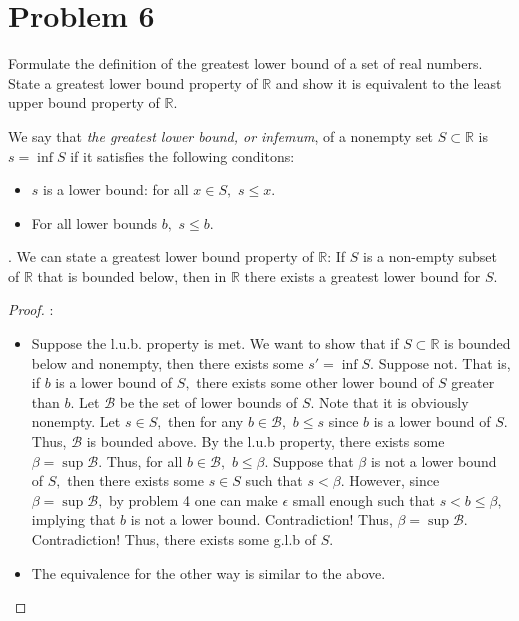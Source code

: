 \documentclass[11pt]{article}
\newcommand{\bbR}{\mathbb{R}}
\begin{document}
\section*{Problem 6}
\begin{problem}
    Formulate the definition of the greatest lower bound of a set of real numbers. State a greatest lower bound property of $\bbR$ and show it is equivalent to the least upper bound property of $\bbR.$
\end{problem}
\begin{solution}
    We say that \textit{the greatest lower bound, or infemum}, of a nonempty set $S\subset \bbR$ is $s = \inf S$ if it satisfies the following conditons:
    \begin{itemize}
        \item $s$ is a lower bound: for all $x\in S,$ $s\leq x.$
        \item For all lower bounds $b,$ $s\leq b.$
    \end{itemize}.
We can state a greatest lower bound property of $\bbR$: If $S$ is a non-empty subset of $\bbR$ that is bounded below, then in $\bbR$ there exists a greatest lower bound for $S.$
\begin{proof}:\\
    \begin{itemize}
        \item Suppose the l.u.b. property is met. We want to show that if $S\subset \bbR$ is bounded below and nonempty, then there exists some $s' = \inf S.$ Suppose not. That is, if $b$ is a lower bound of $S,$ there exists some other lower bound of $S$ greater than $b.$ Let $\mathscr{B}$ be the set of lower bounds of $S.$ Note that it is obviously nonempty. Let $s\in S,$ then for any $b\in \mathscr{B},$ $b\leq s$ since $b$ is a lower bound of $S.$ Thus, $\mathscr{B}$ is bounded above. By the l.u.b property, there exists some $\beta = \sup \mathscr{B}.$ Thus, for all $b\in \mathscr{B},$ $b \leq \beta.$ Suppose that $\beta$ is not a lower bound of $S,$ then there exists some $s\in S$ such that $s< \beta.$ However, since $\beta = \sup \mathscr{B},$ by problem 4 one can make $\epsilon$ small enough such that $s< b \leq \beta,$ implying that $b$ is not a lower bound. Contradiction! Thus, $\beta = \sup \mathscr{B}.$ Contradiction! Thus, there exists some g.l.b of $S.$ 
        \item The equivalence for the other way is similar to the above.
    \end{itemize}
\end{proof}
\end{solution}
\end{document}
